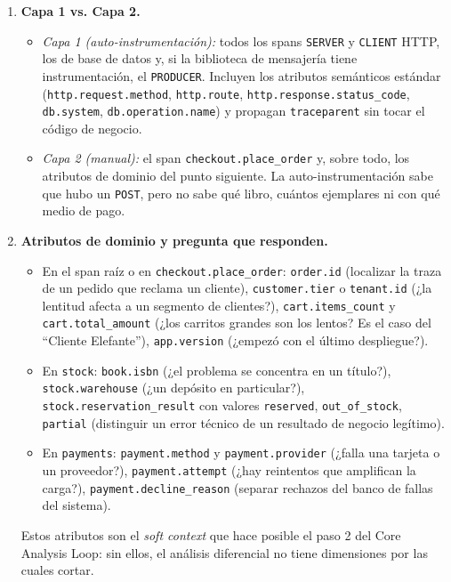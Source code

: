 \documentclass[variant=guia,cover=institutional,mode=screen]{ua-engineering-v6-article}
\begin{document}
\begin{uaanswer}
\begin{enumerate}
\item \textbf{Capa 1 vs. Capa 2.}
\begin{itemize}
\item \emph{Capa 1 (auto-instrumentación):} todos los spans \texttt{SERVER} y \texttt{CLIENT} HTTP, los de base de datos y, si la biblioteca de mensajería tiene instrumentación, el \texttt{PRODUCER}. Incluyen los atributos semánticos estándar (\texttt{http.request.method}, \texttt{http.route}, \texttt{http.response.status\_code}, \texttt{db.system}, \texttt{db.operation.name}) y propagan \texttt{traceparent} sin tocar el código de negocio.
\item \emph{Capa 2 (manual):} el span \texttt{checkout.place\_order} y, sobre todo, los atributos de dominio del punto siguiente. La auto-instrumentación sabe que hubo un \texttt{POST}, pero no sabe qué libro, cuántos ejemplares ni con qué medio de pago.
\end{itemize}

\item \textbf{Atributos de dominio y pregunta que responden.}
\begin{itemize}
\item En el span raíz o en \texttt{checkout.place\_order}: \texttt{order.id} (localizar la traza de un pedido que reclama un cliente), \texttt{customer.tier} o \texttt{tenant.id} (¿la lentitud afecta a un segmento de clientes?), \texttt{cart.items\_count} y \texttt{cart.total\_amount} (¿los carritos grandes son los lentos? Es el caso del ``Cliente Elefante''), \texttt{app.version} (¿empezó con el último despliegue?).
\item En \texttt{stock}: \texttt{book.isbn} (¿el problema se concentra en un título?), \texttt{stock.warehouse} (¿un depósito en particular?), \texttt{stock.reservation\_result} con valores \texttt{reserved}, \texttt{out\_of\_stock}, \texttt{partial} (distinguir un error técnico de un resultado de negocio legítimo).
\item En \texttt{payments}: \texttt{payment.method} y \texttt{payment.provider} (¿falla una tarjeta o un proveedor?), \texttt{payment.attempt} (¿hay reintentos que amplifican la carga?), \texttt{payment.decline\_reason} (separar rechazos del banco de fallas del sistema).
\end{itemize}
Estos atributos son el \emph{soft context} que hace posible el paso 2 del Core Analysis Loop: sin ellos, el análisis diferencial no tiene dimensiones por las cuales cortar.


\end{enumerate}
\end{uaanswer}
\end{document}
